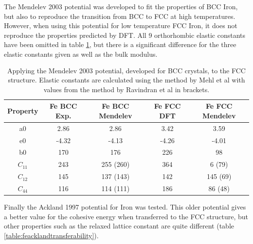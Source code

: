 The Mendelev 2003 potential was developed to fit the properties of BCC Iron, but also to reproduce the transition from BCC to FCC at high temperatures.  However, when using this potential for low  temperature FCC Iron, it does not reproduce the properties predicted by DFT.  All 9 orthorhombic elastic constants have been omitted in table \ref{table:femendelevtransferability}, but there is a significant difference for the three elastic constants given as well as the bulk modulus.

\begin{table}[h]
\begin{center}
\begin{tabular}{c c c c c}
\hline\hline
Property   & Fe BCC Exp. & Fe BCC Mendelev &  Fe FCC DFT & Fe FCC Mendelev \\
\hline\hline
a0             &   2.86  &   2.86      &   3.42   &   3.59          \\
e0             &  -4.32  &  -4.13      &  -4.26   &  -4.01          \\
b0             &   170  &    176       &  226     &   98            \\
$C_{11}$       &   243  &   255 (260)  &  364     &   6 (79)        \\
$C_{12}$       &   145  &   137 (143)  &  142     &   145 (69)      \\
$C_{44}$       &   116  &   114 (111)  &  186     &   86 (48)       \\
\hline\hline
\end{tabular}
\end{center}
\caption{Applying the Mendelev 2003 potential\cite{femendelev}, developed for BCC crystals, to the FCC structure.  Elastic constants are calculated using the method by Mehl et al with values from the method by Ravindran et al in brackets.}
\label{table:femendelevtransferability}
\end{table}

Finally the Ackland 1997 potential for Iron was tested.  This older potential gives a better value for the cohesive energy when transferred to the FCC structure, but other properties such as the relaxed lattice constant are quite different (table \ref{table:feacklandtransferability}).

